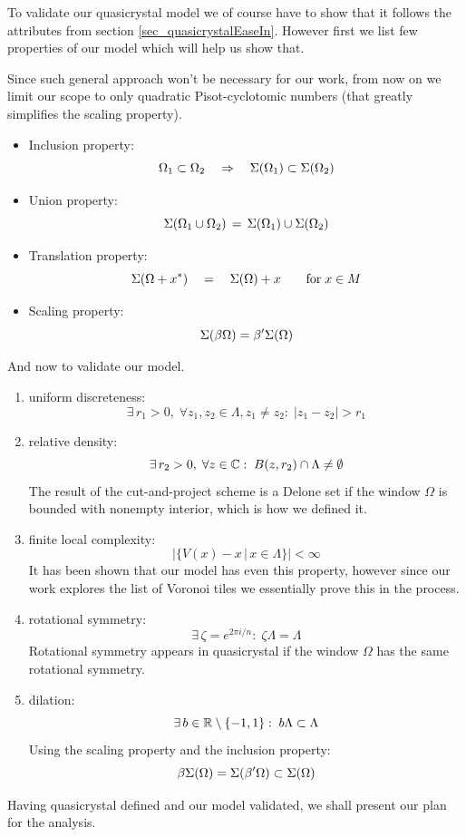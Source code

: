 \documentclass[text.tex]{subfiles}
\begin{document}
To validate our quasicrystal model we of course have to show that it follows the attributes from section \ref{sec_quasicrystalEaseIn}. However first we list few properties of our model which will help us show that. 

Since such general approach won't be necessary for our work, from now on we limit our scope to only quadratic Pisot-cyclotomic numbers (that greatly simplifies the scaling property). 

\begin{itemize}
\item Inclusion property: $$\Omega_1\subset\Omega_2 \quad\Rightarrow\quad \Sigma(\Omega_1)\subset\Sigma(\Omega_2)$$
\item Union property: $$\Sigma(\Omega_1\cup\Omega_2) \,=\, \Sigma(\Omega_1)\cup\Sigma(\Omega_2)$$
\item Translation property: $$\Sigma(\Omega+x^\ast) \quad=\quad \Sigma(\Omega)+x\qquad \text{for}\; x\in M$$
\item Scaling property: $$\Sigma(\beta\Omega) = \beta'\Sigma(\Omega)$$
\end{itemize}

And now to validate our model. 

\begin{enumerate}
\item uniform discreteness: $$\exists\,r_1>0,\; \forall z_1,z_2\in\Lambda, z_1\neq z_2:\; |z_1-z_2|>r_1$$
\item relative density: $$\exists\,r_2>0,\; \forall z\in\mathbb{C}:\; B(z,r_2)\cap\Lambda \neq \emptyset$$
The result of the cut-and-project scheme is a Delone set if the window $\Omega$ is bounded with nonempty interior, which is how we defined it. 
\item finite local complexity: $$\big|\{V(x)-x\,|\, x\in \Lambda\}\big|<\infty$$
It has been shown that our model has even this property, however since our work explores the list of Voronoi tiles we essentially prove this in the process. 
\item rotational symmetry: $$\exists\,\zeta = e^{2\pi i/n}:\; \zeta\Lambda = \Lambda$$
Rotational symmetry appears in quasicrystal if the window $\Omega$ has the same rotational symmetry.
\item dilation: $$\exists\,b\in\mathbb{R}\setminus\{-1,1\}:\; b\Lambda\subset \Lambda$$
Using the scaling property and the inclusion property:
$$\beta\Sigma(\Omega) = \Sigma(\beta'\Omega) \subset \Sigma(\Omega)$$
\end{enumerate}

Having quasicrystal defined and  our model validated, we shall present our plan for the analysis. 
\end{document}
